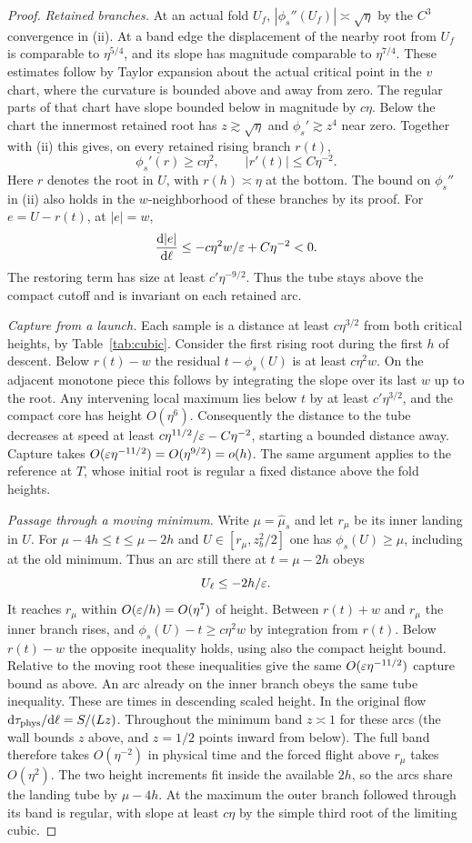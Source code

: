 \begin{proof}
\emph{Retained branches.}
At an actual fold $U_f$, $|\phi_s''(U_f)|\asymp\sqrt\eta$ by the
$C^3$ convergence in (ii). At a band edge the displacement of the
nearby root from $U_f$ is comparable to $\eta^{5/4}$, and its slope
has magnitude comparable to $\eta^{7/4}$. These estimates follow
by Taylor expansion about the actual critical point in the $v$ chart,
where the curvature is bounded above and away from zero. The regular
parts of that chart have slope bounded below in magnitude by $c\eta$.
Below the chart the innermost retained root has $z\gtrsim\sqrt\eta$
and $\phi_s'\gtrsim z^4$ near zero. Together with (ii) this gives,
on every retained rising branch $r(t)$,
\[
 \phi_s'(r)\ge c\eta^2,\qquad |r'(t)|\le C\eta^{-2}.
\]
Here $r$ denotes the root in $U$, with $r(h)\asymp\eta$ at the bottom.
The bound on $\phi_s''$ in (ii) also holds in the $w$-neighborhood
of these branches by its proof. For $e=U-r(t)$, at $|e|=w$,
\[
 \frac{\mathrm{d} |e|}{\mathrm{d}\ell}\le
      -c\eta^2w/\varepsilon+C\eta^{-2}<0 .
\]
The restoring term has size at least $c'\eta^{-9/2}$. Thus the tube
stays above the compact cutoff and is invariant on each retained arc.

\emph{Capture from a launch.}
Each sample is a distance at least $c\eta^{3/2}$ from both critical
heights, by Table~\ref{tab:cubic}. Consider the first rising root
during the first $h$ of descent. Below $r(t)-w$ the residual
$t-\phi_s(U)$ is at least $c\eta^2 w$. On the adjacent monotone
piece this follows by integrating the slope over its last $w$ up to
the root. Any intervening local maximum lies below $t$ by at least
$c'\eta^{3/2}$, and the compact core has height $O(\eta^6)$.
Consequently the distance to the tube decreases at speed at least
$c\eta^{11/2}/\varepsilon-C\eta^{-2}$, starting a bounded distance
away. Capture takes $O(\varepsilon\eta^{-11/2})=O(\eta^{9/2})=o(h)$.
The same argument applies to the reference at $T$, whose initial
root is regular a fixed distance above the fold heights.

\emph{Passage through a moving minimum.}
Write $\mu=\widehat\mu_s$ and let $r_\mu$ be its inner landing in $U$.
For $\mu-4h\le t\le\mu-2h$ and $U\in[r_\mu,z_b^2/2]$ one has
$\phi_s(U)\ge\mu$, including at the old minimum. Thus an arc still
there at $t=\mu-2h$ obeys
\[
 U_\ell\le-2h/\varepsilon .
\]
It reaches $r_\mu$ within $O(\varepsilon/h)=O(\eta^7)$ of height.
Between $r(t)+w$ and $r_\mu$ the inner branch rises, and
$\phi_s(U)-t\ge c\eta^2w$ by integration from $r(t)$. Below
$r(t)-w$ the opposite inequality holds, using also the compact
height bound. Relative to the moving root these inequalities give
the same $O(\varepsilon\eta^{-11/2})$ capture bound as above.
An arc already on the inner branch obeys the same tube inequality.
These are times in descending scaled height. In the original flow
$\mathrm{d}\tau_{\rm phys}/\mathrm{d}\ell=S/(Lz)$. Throughout the minimum band
$z\asymp1$ for these arcs (the wall bounds $z$ above, and $z=1/2$
points inward from below). The full band therefore takes $O(\eta^{-2})$
in physical time and the forced flight above $r_\mu$ takes $O(\eta^2)$.
The two height increments fit inside the available $2h$, so the arcs share the
landing tube by $\mu-4h$. At the maximum the outer branch
followed through its band is regular, with slope at least $c\eta$
by the simple third root of the limiting cubic.


\end{proof}
